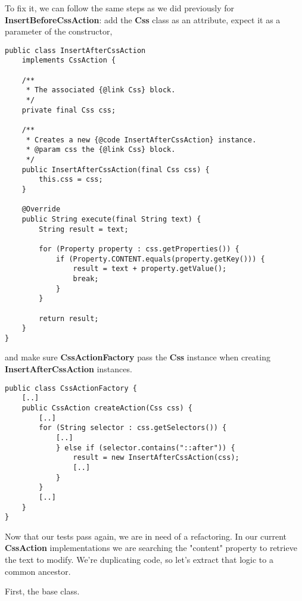 \documentclass[11pt]{article}
\begin{document}
To fix it, we can follow the same steps as we did previously for \textbf{InsertBeforeCssAction}: add the \textbf{Css} class as an
attribute, expect it as a parameter of the constructor,

\begin{verbatim}
public class InsertAfterCssAction
    implements CssAction {

    /**
     * The associated {@link Css} block.
     */
    private final Css css;

    /**
     * Creates a new {@code InsertAfterCssAction} instance.
     * @param css the {@link Css} block.
     */
    public InsertAfterCssAction(final Css css) {
        this.css = css;
    }

    @Override
    public String execute(final String text) {
        String result = text;

        for (Property property : css.getProperties()) {
            if (Property.CONTENT.equals(property.getKey())) {
                result = text + property.getValue();
                break;
            }
        }

        return result;
    }
}
\end{verbatim}

and make sure \textbf{CssActionFactory} pass the \textbf{Css} instance when
creating \textbf{InsertAfterCssAction} instances.

\begin{verbatim}
public class CssActionFactory {
    [..]
    public CssAction createAction(Css css) {
        [..]
        for (String selector : css.getSelectors()) {
            [..]
            } else if (selector.contains("::after")) {
                result = new InsertAfterCssAction(css);
                [..]
            }
        }
        [..]
    }
}
\end{verbatim}

Now that our tests pass again, we are in need of a refactoring.
In our current \textbf{CssAction} implementations we are searching the "content" property to
retrieve the text to modify. We're duplicating code, so let's
extract that logic to a common ancestor.

First, the base class.
\end{document}
